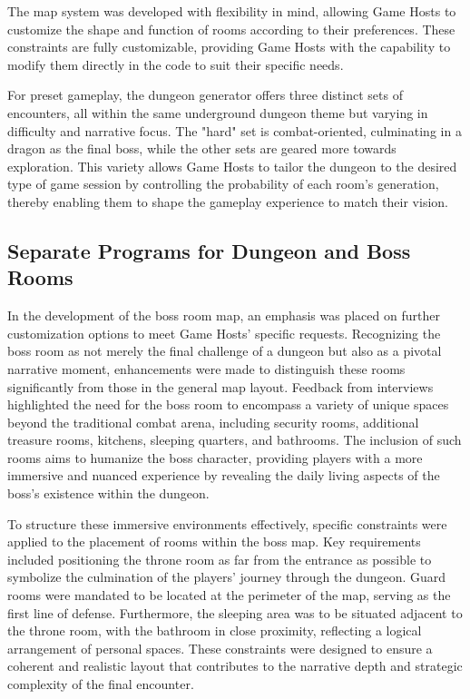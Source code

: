 \documentclass[10pt,twocolumn]{article}
\begin{document}
The map system was developed with flexibility in mind, allowing Game Hosts to customize the shape and function of rooms according to their preferences. These constraints are fully customizable, providing Game Hosts with the capability to modify them directly in the code to suit their specific needs.

For preset gameplay, the dungeon generator offers three distinct sets of encounters, all within the same underground dungeon theme but varying in difficulty and narrative focus. The "hard" set is combat-oriented, culminating in a dragon as the final boss, while the other sets are geared more towards exploration. This variety allows Game Hosts to tailor the dungeon to the desired type of game session by controlling the probability of each room's generation, thereby enabling them to shape the gameplay experience to match their vision.



\subsection{Separate Programs for Dungeon and Boss Rooms}

In the development of the boss room map, an emphasis was placed on further customization options to meet Game Hosts' specific requests. Recognizing the boss room as not merely the final challenge of a dungeon but also as a pivotal narrative moment, enhancements were made to distinguish these rooms significantly from those in the general map layout. Feedback from interviews highlighted the need for the boss room to encompass a variety of unique spaces beyond the traditional combat arena, including security rooms, additional treasure rooms, kitchens, sleeping quarters, and bathrooms. The inclusion of such rooms aims to humanize the boss character, providing players with a more immersive and nuanced experience by revealing the daily living aspects of the boss's existence within the dungeon.

To structure these immersive environments effectively, specific constraints were applied to the placement of rooms within the boss map. Key requirements included positioning the throne room as far from the entrance as possible to symbolize the culmination of the players' journey through the dungeon. Guard rooms were mandated to be located at the perimeter of the map, serving as the first line of defense. Furthermore, the sleeping area was to be situated adjacent to the throne room, with the bathroom in close proximity, reflecting a logical arrangement of personal spaces. These constraints were designed to ensure a coherent and realistic layout that contributes to the narrative depth and strategic complexity of the final encounter.
\end{document}
